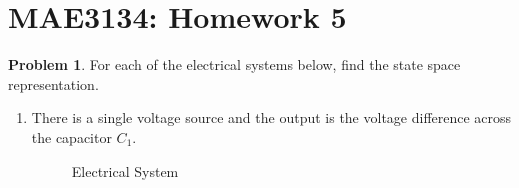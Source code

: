 \documentclass[10pt]{article}
\date{}
\theoremstyle{definition}
\newtheorem{prob}{Problem}[section]
\newenvironment{subprob}%
{\renewcommand{\theenumi}{\alph{enumi}}\renewcommand{\labelenumi}{(\theenumi)}\begin{enumerate}}%
{\end{enumerate}}%
\begin{document}
\pagestyle{empty}
\section*{MAE3134: Homework 5}
\vspace*{-0.4cm}

\begin{prob}
    For each of the electrical systems below, find the state space representation.
    \begin{subprob}
    \item There is a single voltage source and the output is the voltage difference across the capacitor \( C_1 \).
        \begin{figure}[h]
            \centering
            \begin{scaletikzpicturetowidth}{0.8\textwidth}
            \end{scaletikzpicturetowidth}

            \caption{Electrical System}
        \end{figure}


\end{subprob}
\end{prob}
\end{document}
